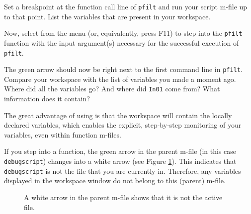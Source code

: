 \begin{action}
Set a breakpoint at the function call line of {\tt pfilt} and run your script m-file up to that point. List the variables that are present in your workspace.
\end{action}

\begin{action}
Now, select  from the  menu (or, equivalently, press F11) to step into the {\tt pfilt} function with the input argument(s) necessary for the successful execution of {\tt pfilt}.
\end{action}

\begin{action}
The green arrow should now be right next to the first command line in {\tt pfilt}. Compare your workspace with the list of variables you made a moment ago. Where did all the variables go? And where did {\tt In01} come from? What information does it contain?
\end{action}



\noindent The great advantage of using  is that the workspace will contain the locally declared variables, which enables the explicit, step-by-step monitoring of your variables, even within function m-files.

 
\noindent If you step into a function, the green arrow in the parent m-file (in this case {\tt debugscript}) changes into a white arrow (see Figure \ref{fig:breakpoint-white-arrow}). This indicates that {\tt debugscript} is not the file that you are currently in. Therefore, any variables displayed in the workspace window do not belong to this (parent) m-file. 


\begin{figure}[!ht]
  \centering
  \caption{A white arrow in the parent m-file shows that it is not the active file.}\label{fig:breakpoint-white-arrow}
\end{figure}


